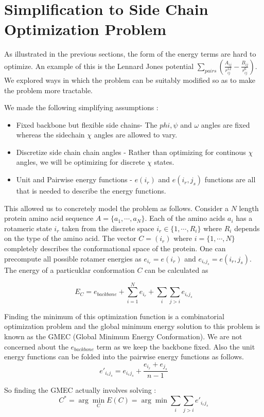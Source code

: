 \documentclass{article} %
\begin{document}
\section{Simplification to Side Chain Optimization Problem}
As illustrated in the previous sections, the form of the energy terms are hard to optimize. An example of this is the Lennard Jones potential $\sum_{pairs} (\frac{A_{ij}}{r^{12}_{ij}}-\frac{B_{ij}}{r^{6}_{ij}})$. We explored ways in which the problem can be suitably modified so as to make the problem more tractable. 

We made the following simplifying assumptions :
\begin{itemize}
\item Fixed backbone but flexible side chains- The $phi, \psi$ and $\omega$ angles are fixed whereas the sidechain $\chi$ angles are allowed to vary.
\item Discretize side chain chain angles - Rather than optimizing for continous $\chi$ angles, we will be optimizing for discrete $\chi$ states. 
\item Unit and Pairwise energy functions - $e(i_r)$ and $e(i_r,j_s)$ functions are all that is needed to describe the energy functions.
\end{itemize}

This allowed us to concretely model the problem as follows. Consider a $N$ length protein amino acid sequence $A=\{ a_1,\cdots,a_N\}$. Each of the amino acids $a_i$ has a rotameric state $i_r$ taken from the discrete space $i_r \in \{1,\cdots,R_i\}$ where $R_i$ depends on the type of the amino acid. The vector $C = (i_r)$ where $i=\{1,\cdots,N\}$ completely describes the conformational space of the protein. One can precompute all possible rotamer energies as $e_{i_r} = e(i_r)$ and $e_{i_rj_s} = e(i_r,j_s)$. The energy of a particuklar conformation $C$ can be calculated as

\[
E_C = e_{backbone} + \sum_{i=1}^N e_{i_r} + \sum_i \sum_{j>i} e_{i_rj_s}
\]

Finding the minimum of this optimization function is a combinatorial optimization problem and the global minimum energy solution to this problem is known as the GMEC (Global Minimum Energy Conformation). We are not concerned about the $e_{backbone}$ term as we keep the backbone fixed. Also the unit energy functions can be folded into the pairwise energy functions as follows. 
\[
e'_{i_rj_s} = e_{i_rj_s} + \frac{e_{i_r} + e_{j_s}}{n-1}
\]

So finding the GMEC actually involves solving : 
\[
C^* = \arg \min_{C} E(C) = \arg \min \sum_i \sum_{j>i} e'_{i_rj_s} 
\]
\end{document}
